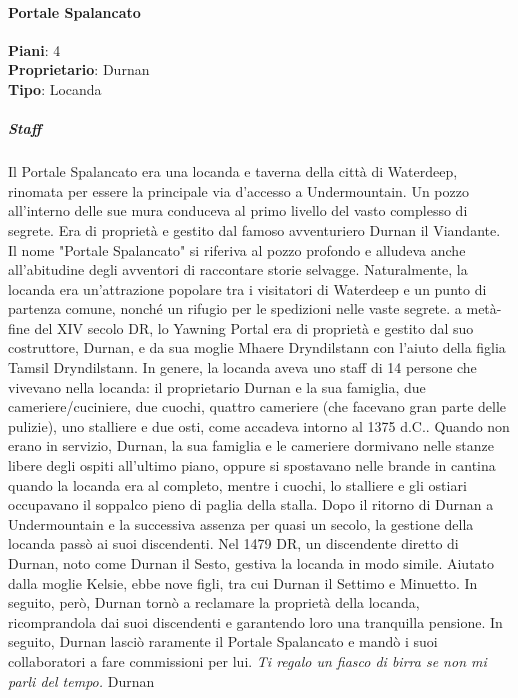\documentclass{article}
\begin{document}
                  \paragraph{Portale Spalancato}
                  \textbf{Piani}: 4 \\
                  \textbf{Proprietario}: Durnan \\
                  \textbf{Tipo}: Locanda \\
                      \subparagraph{Staff}
                    Il Portale Spalancato era una locanda e taverna della città di Waterdeep, rinomata per essere la principale via d'accesso a Undermountain. Un pozzo all'interno delle sue mura conduceva al primo livello del vasto complesso di segrete. Era di proprietà e gestito dal famoso avventuriero Durnan il Viandante. 
                    Il nome "Portale Spalancato" si riferiva al pozzo profondo e alludeva anche all'abitudine degli avventori di raccontare storie selvagge.
                    Naturalmente, la locanda era un'attrazione popolare tra i visitatori di Waterdeep e un punto di partenza comune, nonché un rifugio per le spedizioni nelle vaste segrete.
                    a metà-fine del XIV secolo DR, lo Yawning Portal era di proprietà e gestito dal suo costruttore, Durnan, e da sua moglie Mhaere Dryndilstann con l'aiuto della figlia Tamsil Dryndilstann. In genere, la locanda aveva uno staff di 14 persone che vivevano nella locanda: il proprietario Durnan e la sua famiglia, due cameriere/cuciniere, due cuochi, quattro cameriere (che facevano gran parte delle pulizie), uno stalliere e due osti, come accadeva intorno al 1375 d.C.. Quando non erano in servizio, Durnan, la sua famiglia e le cameriere dormivano nelle stanze libere degli ospiti all'ultimo piano, oppure si spostavano nelle brande in cantina quando la locanda era al completo, mentre i cuochi, lo stalliere e gli ostiari occupavano il soppalco pieno di paglia della stalla.
                    Dopo il ritorno di Durnan a Undermountain e la successiva assenza per quasi un secolo, la gestione della locanda passò ai suoi discendenti. Nel 1479 DR, un discendente diretto di Durnan, noto come Durnan il Sesto, gestiva la locanda in modo simile. Aiutato dalla moglie Kelsie, ebbe nove figli, tra cui Durnan il Settimo e Minuetto. In seguito, però, Durnan tornò a reclamare la proprietà della locanda, ricomprandola dai suoi discendenti e garantendo loro una tranquilla pensione. In seguito, Durnan lasciò raramente il Portale Spalancato e mandò i suoi collaboratori a fare commissioni per lui.
                    \textit{Ti regalo un fiasco di birra se non mi parli del tempo.} Durnan
\end{document}
